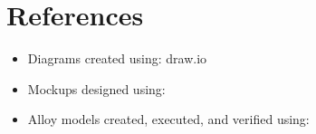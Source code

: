 \chapter{References}

\begin{itemize}
    \item Diagrams created using: draw.io
    \item Mockups designed using:
    \item Alloy models created, executed, and verified using:
\end{itemize}
